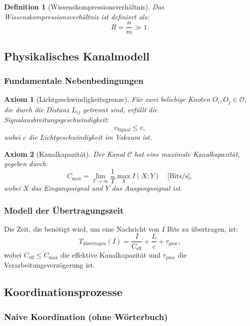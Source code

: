 \documentclass[12pt]{article}
\newtheorem{definition}{Definition}
\newtheorem{axiom}{Axiom}
\begin{document}
	\begin{definition}[Wissenskompressionsverhältnis]
		Das Wissenskompressionsverhältnis ist definiert als:
		\[
		R = \frac{n}{m} \gg 1.
		\]
	\end{definition}
	
	\subsection{Physikalisches Kanalmodell}
	\label{app:channel-model}
	
	\subsubsection{Fundamentale Nebenbedingungen}
	
	\begin{axiom}[Lichtgeschwindigkeitsgrenze]
		Für zwei beliebige Knoten $O_i, O_j \in \mathcal{O}$, die durch die Distanz $L_{ij}$ getrennt sind, erfüllt die Signalausbreitungsgeschwindigkeit:
		\[
		v_{\text{Signal}} \leq c,
		\]
		wobei $c$ die Lichtgeschwindigkeit im Vakuum ist.
	\end{axiom}
	
	\begin{axiom}[Kanalkapazität]
		Der Kanal $\mathcal{C}$ hat eine maximale Kanalkapazität, gegeben durch:
		\[
		C_{\text{max}} = \lim_{T \to \infty} \frac{1}{T} \max_{X} I(X; Y) \quad \text{[Bits/s]},
		\]
		wobei $X$ das Eingangssignal und $Y$ das Ausgangssignal ist.
	\end{axiom}
	
	\subsubsection{Modell der Übertragungszeit}
	
	Die Zeit, die benötigt wird, um eine Nachricht von $I$ Bits zu übertragen, ist:
	\[
	T_{\text{übertragen}}(I) = \frac{I}{C_{\text{eff}}} + \frac{L}{c} + \tau_{\text{proc}},
	\]
	wobei $C_{\text{eff}} \leq C_{\text{max}}$ die effektive Kanalkapazität und $\tau_{\text{proc}}$ die Verarbeitungsverzögerung ist.
	
	\subsection{Koordinationsprozesse}
	\label{app:coordination-processes}
	
	\subsubsection{Naive Koordination (ohne Wörterbuch)}
	
\end{document}
